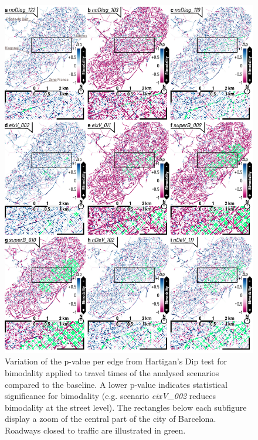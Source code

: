 \begin{figure}[htbp!]
    \centering
    \includegraphics[width=1\textwidth]{LCBM_fig_map_03.jpg}
    \captionsetup{font=scriptsize}
    \caption{Variation of the p-value per edge from Hartigan's Dip test for bimodality applied to travel times of the analysed scenarios compared to the baseline. A lower p-value indicates statistical significance for bimodality (e.g. scenario \emph{eixV\_002} reduces bimodality at the street level). The rectangles below each subfigure display a zoom of the central part of the city of Barcelona. Roadways closed to traffic are illustrated in green.}
   \label{fig:LCBM_fig_map_03}
\end{figure}

